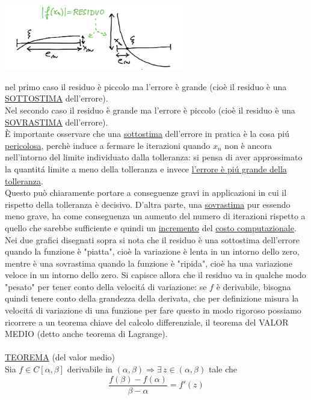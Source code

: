 \documentclass[12pt]{article}
\begin{document}
\begin{center}
    \includegraphics[width=0.6\textwidth]{grafo4.png}
\end{center}
nel primo caso il residuo è piccolo ma l'errore è grande (cioè il residuo è una \underline{SOTTOSTIMA} dell'errore).
\\Nel secondo caso il residuo è grande ma l'errore è piccolo (cioè il residuo è una \underline{SOVRASTIMA} dell'errore).\\
È importante osservare che una \underline{sottostima} dell'errore in pratica è la cosa piú \underline{pericolosa}, perchè induce a fermare le iterazioni quando $x_{n}$ non è ancora nell'intorno del limite individuato dalla tolleranza: si pensa di aver approssimato la quantitá limite a meno della tolleranza e invece \underline{l'errore è piú grande della tolleranza}.
\\Questo può chiaramente portare a conseguenze gravi in applicazioni in cui il rispetto della tolleranza è decisivo.
D'altra parte, una \underline{sovrastima} pur essendo meno grave, ha come conseguenza un aumento del numero di iterazioni rispetto a quello che sarebbe sufficiente e quindi un \underline{incremento} del \underline{costo computazionale}.\\
Nei due grafici disegnati sopra si nota che il residuo è una sottostima dell'errore quando la funzione è "piatta", cioè la variazione è lenta in un intorno dello zero, mentre è una sovrastima quando la funzione è "ripida", cioè ha una variazione veloce in un intorno dello zero.
Si capisce allora che il residuo va in qualche modo "pesato" per tener conto della velocitá di variazione: se $f$ è derivabile, bisogna quindi tenere conto della grandezza della derivata, che per definizione misura la velocitá di variazione di una funzione per fare questo in modo rigoroso possiamo ricorrere a un teorema chiave del calcolo differenziale, il teorema del VALOR MEDIO (detto anche teorema di Lagrange).\\\\
\underline{TEOREMA} (del valor medio)\\
Sia $f \in C[\alpha,\beta]$ derivabile in $(\alpha,\beta) \Longrightarrow \exists\, z\in (\alpha,\beta)$ tale che \[\frac{f(\beta) - f(\alpha)}{\beta - \alpha} = f'(z)\] \newline
\end{document}
